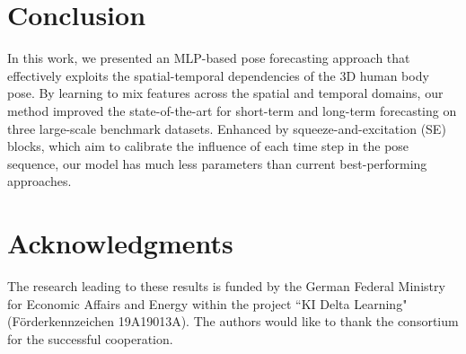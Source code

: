 \documentclass{article}
\begin{document}
\section {Conclusion}

In this work, we presented an MLP-based pose forecasting approach that effectively exploits the spatial-temporal dependencies of the 3D human body pose. By learning to mix features across the spatial and temporal domains, our method improved the state-of-the-art for short-term and long-term forecasting on three large-scale benchmark datasets. Enhanced by
squeeze-and-excitation (SE) blocks, which aim to calibrate the influence of each time step in the pose sequence, our model has much less parameters than current best-performing approaches.


\section*{Acknowledgments}
The research leading to these results is funded by the German Federal Ministry for Economic Affairs and Energy within the project “KI Delta Learning" (Förderkennzeichen 19A19013A). The authors would like to thank the consortium for the successful cooperation.


\end{document}
